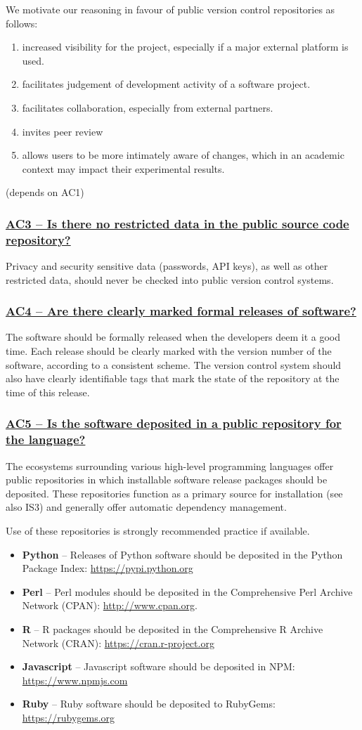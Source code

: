 \documentclass[a4paper,11pt]{article}
\newcommand{\indicator}[1]{\subsubsection*{\underline{#1}}}
\begin{document}
We motivate our reasoning in favour of public version control repositories as follows:

\begin{enumerate}
    \item increased visibility for the project, especially if a major external platform is used.
    \item facilitates judgement of development activity of a software project.
    \item facilitates collaboration, especially from external partners.
    \item invites peer review
    \item allows users to be more intimately aware of changes, which in an
        academic context may impact their experimental results.
\end{enumerate}

(depends on AC1)

\indicator{AC3 -- Is there no restricted data in the public source code repository?}

Privacy and security sensitive data (passwords, API keys), as well as other
restricted data, should never be checked into public version control systems.

\indicator{AC4 -- Are there clearly marked formal releases of software?}

The software should be formally released when the developers deem it a good
time. Each release should be clearly marked with the version number of the
software, according to a consistent scheme. The version control system should
also have clearly identifiable tags that mark the state of the repository at
the time of this release.


\indicator{AC5 -- Is the software deposited in a public repository for the language?}

The ecosystems surrounding various high-level programming languages offer
public repositories in which installable software release packages should be
deposited. These repositories function as a primary source for installation (see also
IS3) and generally offer automatic dependency management.

Use of these repositories is strongly recommended practice if available.

\begin{itemize}
    \item \textbf{Python} -- Releases of Python software should be deposited in
        the Python Package Index: \url{https://pypi.python.org}
    \item \textbf{Perl} --  Perl modules should be deposited in the Comprehensive
        Perl Archive Network (CPAN): \url{http://www.cpan.org}.
    \item \textbf{R} -- R packages should be deposited in the Comprehensive R
        Archive Network (CRAN): \url{https://cran.r-project.org}
    \item \textbf{Javascript} -- Javascript software should be deposited in
        NPM: \url{https://www.npmjs.com}
    \item \textbf{Ruby} -- Ruby software should be deposited to 
        RubyGems: \url{https://rubygems.org}
\end{itemize}
\end{document}
